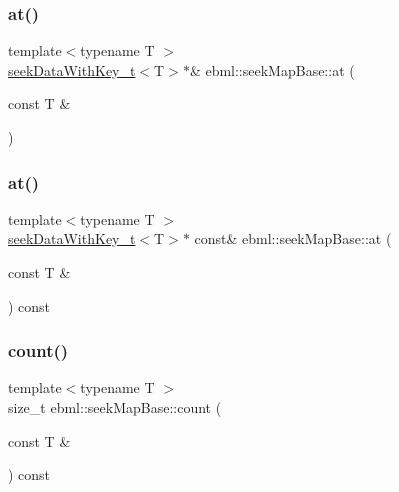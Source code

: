\subsubsection{\texorpdfstring{at()}{at()}\hspace{0.1cm}{\footnotesize\ttfamily [1/2]}}
{\footnotesize\ttfamily template$<$typename T $>$ \\
\mbox{\hyperlink{classebml_1_1seekDataWithKey__t}{seek\+Data\+With\+Key\+\_\+t}}$<$T$>$$\ast$\& ebml\+::seek\+Map\+Base\+::at (\begin{DoxyParamCaption}\item[{const T \&}]{ }\end{DoxyParamCaption})}

\mbox{\label{classebml_1_1seekMapBase_addaab912ae0ef0fc525db52cbdb0aad5}} 
\subsubsection{\texorpdfstring{at()}{at()}\hspace{0.1cm}{\footnotesize\ttfamily [2/2]}}
{\footnotesize\ttfamily template$<$typename T $>$ \\
\mbox{\hyperlink{classebml_1_1seekDataWithKey__t}{seek\+Data\+With\+Key\+\_\+t}}$<$T$>$$\ast$ const\& ebml\+::seek\+Map\+Base\+::at (\begin{DoxyParamCaption}\item[{const T \&}]{ }\end{DoxyParamCaption}) const}

\mbox{\label{classebml_1_1seekMapBase_ac86fad8357bb9738ba022cfdb7f8e43c}} 
\subsubsection{\texorpdfstring{count()}{count()}}
{\footnotesize\ttfamily template$<$typename T $>$ \\
size\+\_\+t ebml\+::seek\+Map\+Base\+::count (\begin{DoxyParamCaption}\item[{const T \&}]{ }\end{DoxyParamCaption}) const}

